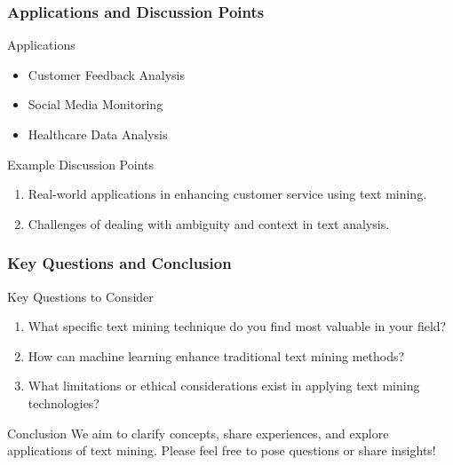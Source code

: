 \documentclass[aspectratio=169]{beamer}
\begin{document}
\begin{frame}[fragile]
    \frametitle{Applications and Discussion Points}
    \begin{block}{Applications}
        \begin{itemize}
            \item Customer Feedback Analysis
            \item Social Media Monitoring
            \item Healthcare Data Analysis
        \end{itemize}
    \end{block}
    
    \begin{block}{Example Discussion Points}
        \begin{enumerate}
            \item Real-world applications in enhancing customer service using text mining.
            \item Challenges of dealing with ambiguity and context in text analysis.
        \end{enumerate}
    \end{block}
\end{frame}

\begin{frame}[fragile]
    \frametitle{Key Questions and Conclusion}
    \begin{block}{Key Questions to Consider}
        \begin{enumerate}
            \item What specific text mining technique do you find most valuable in your field?
            \item How can machine learning enhance traditional text mining methods?
            \item What limitations or ethical considerations exist in applying text mining technologies?
        \end{enumerate}
    \end{block}

    \begin{block}{Conclusion}
        We aim to clarify concepts, share experiences, and explore applications of text mining. Please feel free to pose questions or share insights!
    \end{block}
\end{frame}
\end{document}
